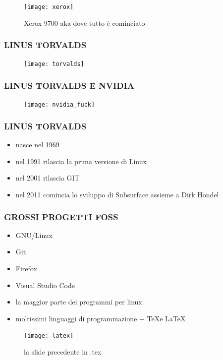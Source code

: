 \documentclass{beamer}
\begin{document}
\begin{frame}
    \begin{figure}
        \texttt{[image: xerox]}
        \caption{Xerox 9700 aka dove tutto è cominciato}
    \end{figure}
\end{frame}

\begin{frame}
    \frametitle{LINUS TORVALDS}
    \begin{figure}
        \texttt{[image: torvalds]}
    \end{figure}
\end{frame}
\begin{frame}
    \frametitle{LINUS TORVALDS E NVIDIA}
    \begin{figure}
        \texttt{[image: nvidia\_fuck]}
    \end{figure}
\end{frame}


\begin{frame}
    \frametitle{LINUS TORVALDS}
        \begin{itemize}
            \item nasce nel 1969
            \item nel 1991 rilascia la prima versione di Linux
            \item nel 2001 rilascia GIT
            \item nel 2011 comincia lo sviluppo di Subsurface assieme a Dirk Hondel
        \end{itemize}
\end{frame}

\begin{frame}
    \frametitle{GROSSI PROGETTI FOSS}
        \begin{itemize}
            \item GNU/Linux
            \item Git 
            \item Firefox
            \item Visual Studio Code 
            \item la maggior parte dei programmi per linux 
            \item moltissimi linguaggi di programmazione + \TeX e \LaTeX
        \end{itemize}
\end{frame}


\begin{frame}
    \begin{figure}
        \begin{center}
        \texttt{[image: latex]}
        \caption{la slide precedente in .tex }
        \end{center}
    \end{figure}
\end{frame}
\end{document}
